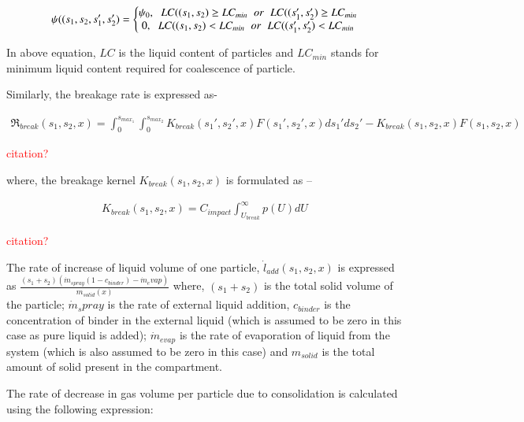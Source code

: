 \documentclass[preprint,11pt,authoryear]{elsarticle}
\begin{document}
	    \begin{align}
	    \psi((s_1,s_2,s_1',s_2') = 
	    \left\{\begin{matrix}
	    \psi_0,\hspace{0.2cm} LC((s_1,s_2) \geq LC_{min}\hspace{0.2cm} or\hspace{0.2cm} LC((s_1',s_2') \geq LC_{min}	\\ 
	    0,\hspace{0.2cm} LC((s_1,s_2) < LC_{min}\hspace{0.2cm} or\hspace{0.2cm} LC((s_1',s_2') < LC_{min}
	    \end{matrix}\right.
	    \end{align}
	    \par In above equation, $LC$ is the liquid content of particles and $LC_{min}$ stands for minimum liquid content required for coalescence of particle.  
	    \par Similarly, the breakage rate is expressed as-
	
	    \begin{align}
	    \Re_{break}(s_1,s_2,x) = \int_0^{s_{max_1}} \int_0^{s_{max_2}} K_{break}(s_1',s_2',x)F(s_1',s_2',x)ds_1'ds_2' - K_{break}(s_1,s_2,x)F(s_1,s_2,x)
	    \end{align}
	    \par \textcolor{red}{citation?}
	    
	    \par where, the breakage kernel $K_{break}(s_1,s_2,x)$ is formulated as – 
	    
	    \begin{align}
	    K_{break}(s_1,s_2,x) = C_{impact}\int_{U_{break}}^{\infty}p(U)dU
	    \end{align}
	    \par \textcolor{red}{citation?}
	
	      \par The rate of increase of liquid volume of one particle, $\dot{l}_{add}(s_1,s_2,x)$ is expressed as $\frac{(s_1+s_2)(\dot{m}_{spray}(1-c_{binder})-\dot{m}_evap)}{m_{solid}(x)}$ where, $(s_1+s_2)$  is the total solid volume of the particle; $\dot{m}_spray$ is the rate of external liquid addition, $c_{binder}$ is the concentration of binder in the external liquid (which is assumed to be zero in this case as pure liquid is added); $\dot{m}_{evap}$ is the rate of evaporation of liquid from the system (which is also assumed to be zero in this case) and $m_{solid}$ is the total amount of solid present in the compartment.
	      \par The rate of decrease in gas volume per particle due to consolidation is calculated using the following expression: 
	      
\end{document}
